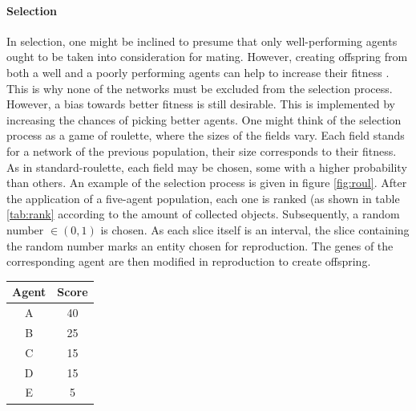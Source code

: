 \documentclass[10pt,a4paper,DIV=11]{scrreprt}
\begin{document}
\paragraph{Selection}
In selection, one might be inclined to presume that only well-performing agents ought to be taken into consideration for mating. However, creating
offspring from both a well and a poorly performing agents can help to increase their fitness \cite{KIKLAR}. This is why none
of the networks must be excluded from the selection process. However, a bias towards better fitness is still desirable. This is implemented by 
increasing the chances of picking better agents. One might think of the selection process as a game of roulette, where the sizes of the
fields vary. Each field stands for a network of the previous population, their size corresponds to their fitness. As in standard-roulette, each
field may be chosen, some with a higher probability than others. An example of the selection process is given in figure \ref{fig:roul}. After the 
application of a five-agent population, each one is ranked (as shown in table \ref{tab:rank} according to the amount of collected objects. 
Subsequently, a random number $\in (0,1)$ is chosen. As each slice itself is an interval, the slice containing the random number marks an entity 
chosen for reproduction. The genes of the corresponding agent are then modified in reproduction to create offspring.
  
\begin{minipage}{\textwidth}
  \begin{minipage}[b]{0.49\textwidth}
    \centering
        \label{fig:roul}
  \end{minipage}
  \hfill
  \begin{minipage}[b]{0.49\textwidth}
    \centering
      \begin{tabular}{|c|c|} \hline
         Agent & Score \\ \hline
         A & 40 \\ \hline
         B & 25 \\ \hline
         C & 15 \\ \hline
         D & 15 \\ \hline
         E & 5  \\ \hline
      \end{tabular}
          \label{tab:rank}
    \end{minipage}
  \end{minipage}
\end{document}
